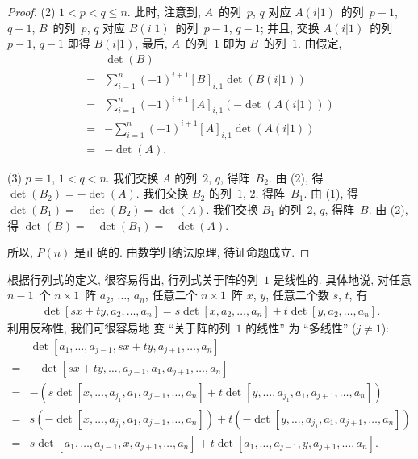 \documentclass[%
    UTF8,%
    fontset=none,%
    punct=kaiming,%
    zihao=-4,%
    a4paper,%
    oneside,%
]{ctexbook}
\renewcommand*{\leq}{\leqslant}
\begin{document}
\begin{proof}
    (2)
    \(1 < p < q \leq n\).
    此时, 注意到, \(A\)~的列~\(p\), \(q\)
    对应 \(A(i|1)\)~的列~\(p - 1\), \(q - 1\),
    \(B\)~的列~\(p\), \(q\)
    对应 \(B(i|1)\)~的列~\(p - 1\), \(q - 1\);
    并且, 交换
    \(A(i|1)\)~的列~\(p - 1\), \(q - 1\)
    即得 \(B(i|1)\),
    最后, \(A\)~的列~\(1\) 即为 \(B\)~的列~\(1\).
    由假定,
    \begin{align*}
             & \det {(B)}
        \\
        = {} &
        \sum_{i = 1}^{n}
        {(-1)^{i+1} [B]_{i,1} \det {(B(i|1))}}
        \\
        = {} &
        \sum_{i = 1}^{n}
        {(-1)^{i+1} [A]_{i,1} (-\det {(A(i|1))})}
        \\
        = {} &
        {-\sum_{i = 1}^{n}
        {(-1)^{i+1} [A]_{i,1} \det {(A(i|1))}}}
        \\
        = {} & {-\det {(A)}}.
    \end{align*}

    (3)
    \(p = 1\), \(1 < q < n\).
    我们交换 \(A\) 的列~\(2\), \(q\), 得阵~\(B_2\).
    由 (2), 得 \(\det {(B_2)} = -\det {(A)}\).
    我们交换 \(B_2\) 的列~\(1\), \(2\), 得阵~\(B_1\).
    由 (1), 得 \(\det {(B_1)} = -\det {(B_2)} = \det {(A)}\).
    我们交换 \(B_1\) 的列~\(2\), \(q\), 得阵~\(B\).
    由 (2), 得 \(\det {(B)} = -\det {(B_1)} = -\det {(A)}\).

    所以, \(P(n)\) 是正确的.
    由数学归纳法原理, 待证命题成立.
\end{proof}

根据行列式的定义, 很容易得出,
行列式关于阵的列~\(1\) 是线性的.
具体地说,
对任意 \(n-1\)~个 \(n \times 1\)~阵
\(a_2\), \(\dots\), \(a_n\),
任意二个 \(n \times 1\)~阵 \(x\), \(y\),
任意二个数 \(s\), \(t\),
有
\begin{align*}
    \det
    {[sx + ty, a_2, \dots, a_n]}
    = s
    \det {[x, a_2, \dots, a_n]}
    +
    t
    \det {[y, a_2, \dots, a_n]}.
\end{align*}
利用反称性, 我们可很容易地%
变 ``关于阵的列~\(1\) 的线性''
为 ``多线性'' (\(j \neq 1\)):
\begin{align*}
         & \det
    {[a_1, \dots, a_{j-1}, sx + ty, a_{j+1}, \dots, a_n]}
    \\
    = {} & {-\det
            {[sx + ty, \dots, a_{j-1}, a_1, a_{j+1}, \dots, a_n]}}
    \\
    = {} & {-
            (s
            \det {[x, \dots, a_{j_1}, a_1, a_{j+1}, \dots, a_n]}
            +
            t
            \det {[y, \dots, a_{j_1}, a_1, a_{j+1}, \dots, a_n]}
            )
        }
    \\
    = {} &
    s(-\det {[x, \dots, a_{j_1}, a_1, a_{j+1}, \dots, a_n]})
    + t(-\det {[y, \dots, a_{j_1}, a_1, a_{j+1}, \dots, a_n]})
    \\
    = {} &
    s
    \det {[a_1, \dots, a_{j-1}, x, a_{j+1}, \dots, a_n]}
    +
    t
    \det {[a_1, \dots, a_{j-1}, y, a_{j+1}, \dots, a_n]}.
\end{align*}
\end{document}
